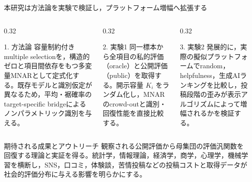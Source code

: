 \documentclass[aspectratio=169,10pt]{beamer}
\newcommand{\1}{\mathbf{1}}
\begin{document}
\begin{frame}[shrink=5]{本研究は方法論を実験で検証し，プラットフォーム増幅へ拡張する}
\begin{columns}[T,onlytextwidth]
\begin{column}{0.32\textwidth}
\begin{block}{1. 方法論}
\scriptsize
容量制約付きmultiple selectionを，構造的ゼロと項目間依存をもつ多変量MNARとして定式化する。既存モデルと識別仮定が異なるため，平均・裾確率のtarget-specific bridgeによるノンパラメトリック識別を与える。
\end{block}
\end{column}
\begin{column}{0.32\textwidth}
\begin{block}{2. 実験1}
\scriptsize
同一標本から全項目の私的評価（oracle）と公開評価（public）を取得する。開示容量 $K_i$ をランダム化し，MNARのcrowd-outと識別・回復性能を直接比較する。
\end{block}
\end{column}
\begin{column}{0.32\textwidth}
\begin{block}{3. 実験2}
\scriptsize
発展的に，実際の擬似プラットフォームでrandom，helpfulness，生成AIランキングを比較し，投稿段階の歪みが表示アルゴリズムによって増幅されるかを検証する。
\end{block}
\end{column}
\end{columns}
\begin{alertblock}{期待される成果とアウトリーチ}
\scriptsize
観察される公開評価から母集団の評価汎関数を回復する理論と実証を得る。統計学，情報理論，経済学，商学，心理学，機械学習を横断し，SNS，口コミ，体験談，苦情投稿などの投稿コストと取得データが社会的評価分布に与える影響を明らかにする。
\end{alertblock}
\end{frame}
\end{document}
